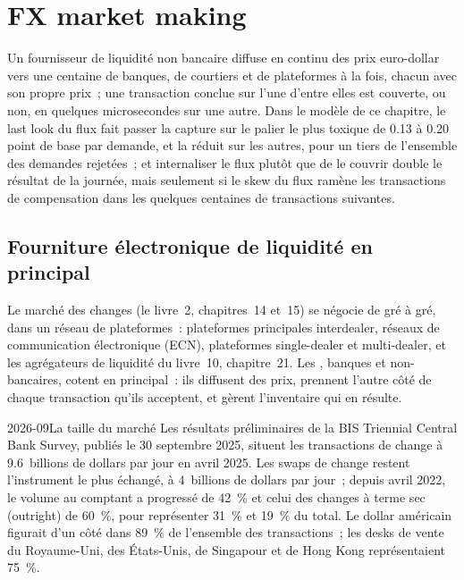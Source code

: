 \chapter{FX market making}\label{ch:hf:fx-market-making}

Un fournisseur de liquidité non bancaire diffuse en continu des prix euro-dollar vers une centaine de banques, de courtiers et de plateformes à la fois, chacun avec son propre prix~; une transaction conclue sur
l'une d'entre elles est couverte, ou non, en quelques microsecondes sur une autre. Dans le modèle de ce chapitre, le last look du flux fait passer la capture sur le
palier le plus toxique de 0.13 à 0.20 point de base par demande, et la réduit sur les autres, pour un tiers de l'ensemble des demandes rejetées~; et internaliser le flux plutôt
que de le couvrir double le résultat de la journée, mais seulement si le skew du flux ramène les transactions de compensation dans les quelques centaines de transactions suivantes.

\section{Fourniture électronique de liquidité en principal}

Le marché des changes (le livre~2, chapitres~14 et~15) se négocie de gré à gré, dans un réseau de plateformes~: plateformes principales interdealer, réseaux de
communication électronique (ECN), plateformes single-dealer et multi-dealer, et les agrégateurs de liquidité du livre~10, chapitre~21. Les , banques et non-bancaires, cotent en principal~: ils diffusent des prix, prennent l'autre côté de chaque transaction qu'ils acceptent, et gèrent l'inventaire
qui en résulte.

\begin{dated}{2026-09}{La taille du marché}\label{dat:hf:fx-market-making:bis}
Les résultats préliminaires de la BIS Triennial Central Bank Survey, publiés le 30 septembre 2025, situent les transactions de change à 9.6~billions de dollars par jour en avril 2025.
Les swaps de change restent l'instrument le plus échangé, à 4~billions de dollars par jour~; depuis avril 2022, le volume au comptant a progressé de 42~\% et celui des changes à terme sec (outright) de 60~\%, pour représenter 31~\%
et 19~\% du total. Le dollar américain figurait d'un côté dans 89~\% de l'ensemble des transactions~; les desks de vente du Royaume-Uni, des États-Unis, de Singapour et de Hong
Kong représentaient 75~\%.
\end{dated}


